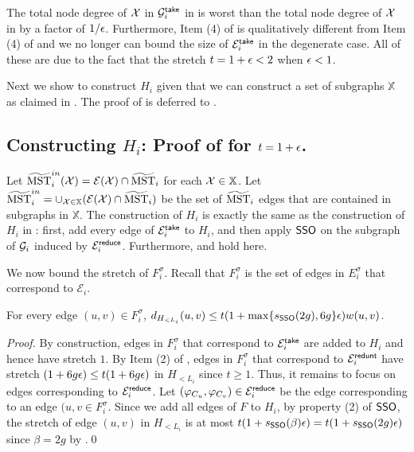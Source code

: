


The total node degree of $\mathcal{X}$ in $\mathcal{G}_i^{\mathsf{take}}$ in  is worst than the total node degree of $\mathcal{X}$  in  by a factor of $1/\epsilon$.  Furthermore, Item (4) of  is qualitatively different from  Item (4) of  and we no longer can bound the size of $\mathcal{E}_i^{\mathsf{take}}$ in the degenerate case. All of these are due to the fact that the stretch $t = 1+\epsilon < 2$ when $\epsilon < 1$. 



Next we show to construct $H_i$ given that we can construct a set of subgraphs $\mathbb{X}$ as claimed in . The proof of  is deferred to .

\subsection{Constructing $H_i$: Proof of  for $t = 1+\epsilon$.} \label{subsec:ConstructHiTE}


Let $\widetilde{\mathrm{MST}}^{in}_i(\mathcal{X}) = \mathcal{E}(\mathcal{X})\cap \widetilde{\mathrm{MST}}_i$ for each $\mathcal{X} \in \mathbb{X}$. Let $\widetilde{\mathrm{MST}}^{in}_i = \cup_{\mathcal{X} \in \mathbb{X}}(\mathcal{E}(\mathcal{X})\cap \widetilde{\mathrm{MST}}_i)$ be the set of $\widetilde{\mathrm{MST}}_i$ edges that are contained in subgraphs in $\mathbb{X}$.   The construction of $H_i$ is exactly the same as the construction of $H_i$ in : first, add every edge of $\mathcal{E}_i^{\mathsf{take}}$ to $H_i$, and then apply \hyperlink{SPHigh}{$\mathsf{SSO}$} on the subgraph of $\mathcal{G}_i$ induced by $\mathcal{E}_i^{\mathsf{reduce}}$. Furthermore,  and  hold here.  

We now bound the stretch of $F^\sigma_{i}$. Recall that $F^\sigma_{i}$ is the set of edges in $E^{\sigma}_i$ that correspond to $\mathcal{E}_i$.

\begin{lemma}\label{lm:Hi-StretchT1E} For every edge $(u,v) \in F^\sigma_{i}$, $d_{H_{< L_i}}(u,v) \leq t(1+ \max\{s_{\mathsf{SSO}}(2g),6g\}\epsilon)w(u,v)$.
\end{lemma}
\begin{proof}
	By construction, edges in $F^{\sigma}_i$ that correspond to $\mathcal{E}_i^{\mathsf{take}}$ are added to $H_i$ and hence have stretch $1$. By Item (2) of , edges in $F^{\sigma}_i$ that correspond to $\mathcal{E}_i^{\mathsf{redunt}}$ have stretch $ (1+6g\epsilon)\leq t(1+6g\epsilon)$ in $H_{< L_i}$ since $t\geq 1$. Thus, it remains to focus on edges corresponding to $\mathcal{E}_i^{\mathsf{reduce}}$. Let $(\varphi_{C_u},\varphi_{C_v}) \in \mathcal{E}^{\mathsf{reduce}}_i$ be the edge corresponding to an edge $(u,v \in F^{\sigma}_i$.  	Since we add all edges of $F$ to $H_i$, by property (2) of \hyperlink{SPHigh}{$\mathsf{SSO}$}, the stretch of edge $(u,v)$ in $H_{< L_i}$ is at most $t(1+s_{\mathsf{SSO}}(\beta)\epsilon) = t(1+s_{\mathsf{SSO}}(2g)\epsilon)$ since $\beta  = 2g$ by .\qed
\end{proof}


